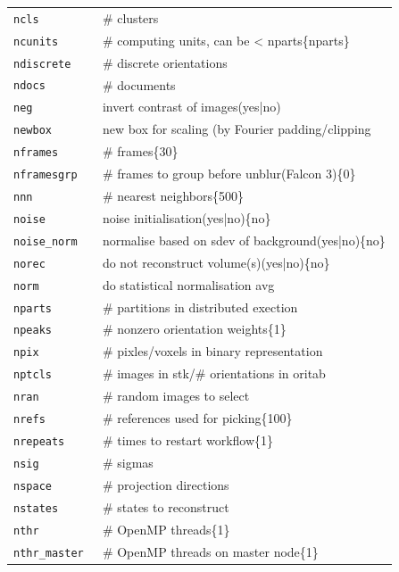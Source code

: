 \documentclass[a4paper,11pt]{article}
\begin{document}
\begin{tabular}{ll}
\texttt{ncls            }&{ \# clusters}\\
\texttt{ncunits         }&{ \# computing units, can be < nparts\{nparts\}}\\
\texttt{ndiscrete       }&{ \# discrete orientations}\\
\texttt{ndocs           }&{ \# documents}\\
\texttt{neg             }&{ invert contrast of images(yes|no)}\\
\texttt{newbox          }&{ new box for scaling (by Fourier padding/clipping}\\
\texttt{nframes         }&{ \# frames\{30\}}\\
\texttt{nframesgrp      }&{ \# frames to group before unblur(Falcon 3)\{0\}}\\
\texttt{nnn             }&{ \# nearest neighbors\{500\}}\\
\texttt{noise           }&{ noise initialisation(yes|no)\{no\}}\\
\texttt{noise\_norm      }&{ normalise based on sdev of background(yes|no)\{no\}}\\
\texttt{norec           }&{ do not reconstruct volume(s)(yes|no)\{no\}}\\
\texttt{norm            }&{ do statistical normalisation avg}\\
\texttt{nparts          }&{ \# partitions in distributed exection}\\
\texttt{npeaks          }&{ \# nonzero orientation weights\{1\}}\\
\texttt{npix            }&{ \# pixles/voxels in binary representation}\\
\texttt{nptcls          }&{ \# images in stk/\# orientations in oritab}\\
\texttt{nran            }&{ \# random images to select}\\
\texttt{nrefs           }&{ \# references used for picking\{100\}}\\
\texttt{nrepeats        }&{ \# times to restart workflow\{1\}}\\
\texttt{nsig            }&{ \# sigmas}\\
\texttt{nspace          }&{ \# projection directions}\\
\texttt{nstates         }&{ \# states to reconstruct}\\
\texttt{nthr            }&{ \# OpenMP threads\{1\}}\\
\texttt{nthr\_master     }&{ \# OpenMP threads on master node\{1\}}\\

\end{tabular}
\end{document}
